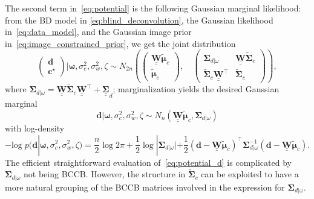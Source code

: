 \documentclass[12pt]{article}
\newcommand{\mybcirc}[1] {\underline{\underline{\bm{#1}}}}
\begin{document}
The second term in~\eqref{eq:potential} is the following Gaussian marginal likelihood: 
from the BD model in \eqref{eq:blind_deconvolution}, the Gaussian likelihood in~\eqref{eq:data_model}, and the  Gaussian image prior in~\eqref{eq:image_constrained_prior}, we get the joint distribution
\begin{equation} \label{eq:joint_d_c_star}
    \begin{pmatrix} \bm{d} \\ \bm{c}^{\star}\end{pmatrix} | \bm{\omega}, \sigma_c^2, \sigma_w^2, \zeta \sim N_{2n} \left (
    \begin{pmatrix} \mybcirc{W} \tilde{\bm{\mu}}_c \\ \tilde{\bm{\mu}}_c
    \end{pmatrix}, \quad
    \begin{pmatrix} 
    \bm{\Sigma}_{d|\omega} & \mybcirc{W} \tilde{\bm{\Sigma}}_c  \\
    \tilde{\bm{\Sigma}}_c \mybcirc{W}^{\top} & \tilde{\bm{\Sigma}}_c 
    \end{pmatrix} \right ),
\end{equation}
where $\bm{\Sigma}_{d|\omega} = \mybcirc{W} \tilde{\bm{\Sigma}}_c \mybcirc{W}^{\top}  + \mybcirc{\Sigma}_d$; marginalization yields the desired Gaussian marginal
\begin{equation} \label{eq:collapsed_lik_constr}
    \bm{d}|\bm{\omega}, \sigma_c^2, \sigma_w^2, \zeta \sim N_n(\mybcirc{W} \tilde{\bm{\mu}}_c, \bm{\Sigma}_{d|\omega})
\end{equation}
with log-density 
\begin{equation} \label{eq:potential_d}
    -\mbox{log} \; p(\bm{d} | \bm{\omega}, \sigma_c^2, \sigma_w^2, \zeta) = \frac{n}{2} \log 2\pi + \frac{1}{2}\log |\bm{\Sigma}_{d|\omega}| + \frac{1}{2}(\bm{d} - \mybcirc{W} \tilde{\bm{\mu}}_c)^{\top} \bm{\Sigma}_{d|\omega}^{-1} (\bm{d} - \mybcirc{W} \tilde{\bm{\mu}}_c).
\end{equation} 
The efficient straightforward evaluation of~\eqref{eq:potential_d} is complicated by $\bm{\Sigma}_{d|\omega}$ not being BCCB.
However, the structure in $\tilde{\bm{\Sigma}}_c$ can be exploited to have a more natural grouping of the BCCB matrices involved in the expression for $\bm{\Sigma}_{d|\omega}$.
\end{document}
